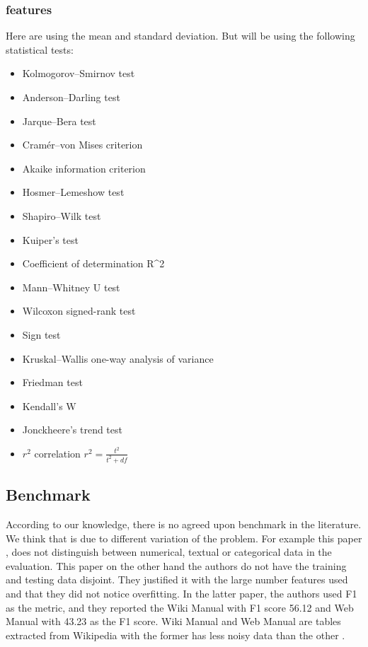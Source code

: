 \documentclass{article}
\begin{document}
\subsubsection{features} \label{features-sec}
Here are using the mean and standard deviation. But will be using the following statistical tests:
\begin{itemize}
\item Kolmogorov–Smirnov test
\item Anderson–Darling test
\item Jarque–Bera test
\item Cramér–von Mises criterion
\item Akaike information criterion
\item Hosmer–Lemeshow test
\item Shapiro–Wilk test
\item Kuiper's test
\item Coefficient of determination R\^{}2
\item Mann–Whitney U test
\item Wilcoxon signed-rank test
\item Sign test
\item Kruskal–Wallis one-way analysis of variance
\item Friedman test
\item Kendall's W
\item Jonckheere's trend test
\item $r^2$ correlation $ r^2 = \frac{t^2}{t^2 + df} $
\end{itemize}

\subsection{Benchmark}\label{benchmark-sec}
According to our knowledge, there is no agreed upon benchmark in the literature. We think that is due to different variation of the problem. For example this paper \cite{karma}, does not distinguish between numerical, textual or categorical data in the evaluation. This paper on the other hand \cite{ann-ser-webtables} the authors do not have the training and testing data disjoint. They justified it with the large number features used and that they did not notice overfitting. In the latter paper, the authors used F1 as the metric, and they reported the Wiki Manual with F1 score 56.12 and Web Manual with 43.23 as the F1 score. Wiki Manual and Web Manual are tables extracted from Wikipedia with the former has less noisy data than the other \cite{ann-ser-webtables}.
\end{document}
